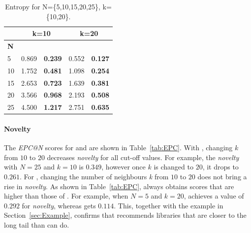 
\begin{table}[h!]
	\footnotesize
	\caption{Entropy for N=\{5,10,15,20,25\}, k=\{10,20\}.}
	\centering
	\begin{tabular}{|p{0.8cm}||p{1.2cm}|p{1.2cm}||p{1.2cm}|p{1.2cm}|} \hline		
		& \multicolumn{2}{c||}{\textbf{k=10}}  & \multicolumn{2}{c|}{\textbf{k=20}} \\ \hline
		\textbf{N}	& \LR    & \CR  & \LR    & \CR	  \\ \hline	
		5       & 0.869   	 & \textbf{0.239}  	& 0.552 		& \textbf{0.127}    \\ \hline
		10      & 1.752      & \textbf{0.481}  	& 1.098 		& \textbf{0.254}    \\ \hline
		15      & 2.653      & \textbf{0.723}  	& 1.639 		& \textbf{0.381}    \\ \hline
		20      & 3.566      & \textbf{0.968}  	& 2.193 		& \textbf{0.508}    \\ \hline
		25      & 4.500      & \textbf{1.217}  	& 2.751 		& \textbf{0.635}    \\ \hline
	\end{tabular}
	\vspace{-.1cm}
	\label{tab:Entropy}
\end{table}


\noindent
\paragraph{\textbf{Novelty}} The \emph{EPC@N} scores for \LR and \CR are shown in Table~\ref{tab:EPC}. With \LR, changing $k$ from $10$ to $20$ decreases \emph{novelty} for all cut-off values. For example, the \emph{novelty} with $N=25$ and $k=10$ is $0.349$, however once $k$ is changed to $20$, it drops to $0.261$. For \CR, changing the number of neighbours \emph{k} from $10$ to $20$ does not bring a rise in \emph{novelty}. As shown in Table~\ref{tab:EPC}, \CR always obtains scores that are higher than those of \LR. For example, when $N=5$ and $k=20$, \CR achieves a value of $0.292$ for \emph{novelty}, whereas \LR gets $0.114$. This, together with the example in Section~\ref{sec:Example}, confirms that \CR recommends libraries that are closer to the long tail than \LR can do.  %

